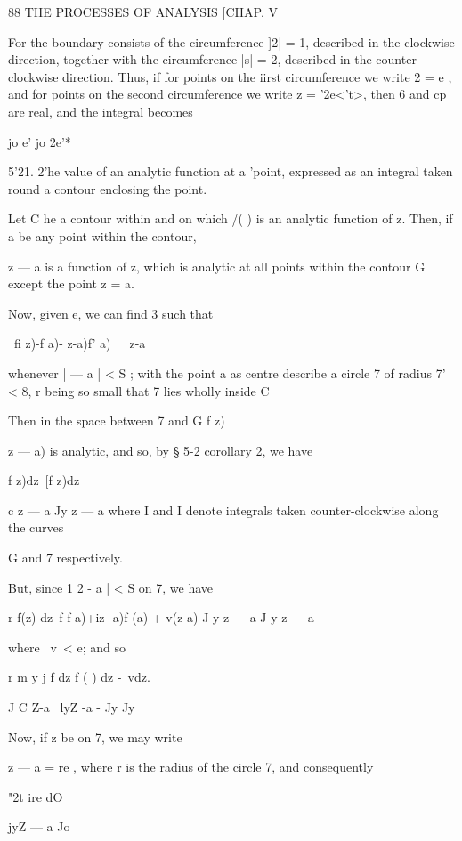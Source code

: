 {  



88 THE PROCESSES OF ANALYSIS [CHAP. V 

For the boundary consists of the circumference ]2| = 1, described in the clockwise 
direction, together with the circumference |s| = 2, described in the counter-clockwise 
direction. Thus, if for points on the iirst circumference we write 2 = e  , and for points on 
the second circumference we write z = '2e<'t>, then 6 and cp are real, and the integral becomes 

jo e'  jo 2e'* 

5'21. 2'he value of an analytic function at a 'point, expressed as an integral 
taken round a contour enclosing the point. 

Let C he a contour within and on which /( ) is an analytic function of z. 
Then, if a be any point within the contour, 

z — a 
is a function of z, which is analytic at all points within the contour G except 
the point z = a. 

Now, given e, we can find 3 such that 

\ fi z)-f a)- z-a)f' a)\ \   \ z-a\ 

whenever |   — a | < S ; with the point a as centre describe a circle 7 of radius 
7' < 8, r being so small that 7 lies wholly inside C 

Then in the space between 7 and G f z)\ \ {z — a) is analytic, and so, by 
§ 5-2 corollary 2, we have 

f z)dz\ [f z)dz 



c z — a Jy z — a 
where I and I denote integrals taken counter-clockwise along the curves 

G and 7 respectively. 

But, since 1 2  - a | < S on 7, we have 

r f(z) dz\ f f a)+iz- a)f (a) + v(z-a)    
J y z — a J y z — a 

where \ v\ <  e; and so 

r m  y j f dz f ( )   dz -\ vdz. 

J C Z-a   \ lyZ -a -  Jy Jy 

Now, if z be on 7, we may write 

z — a = re , 
where r is the radius of the circle 7, and consequently 

"2t ire dO 



jyZ — a Jo 



}}
